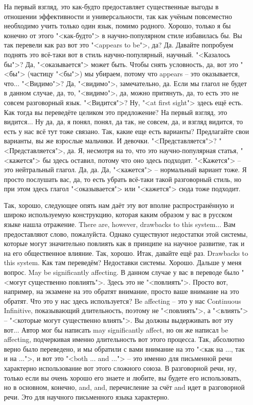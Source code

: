\documentclass[main.tex]{subfiles}
\begin{document}
На первый взгляд, это как-будто предоставляет существенные выгоды в отношении эффективности и универсальности, так как учёным повсеместно необходимо учить только один язык, помимо родного.
Хорошо, только я бы конечно от этого "<как-будто"> в научно-популярном стиле избавилась бы.
Вы так перевели как раз вот это "<appears to be">, да?
Да.
Давайте попробуем поднять это всё-таки вот в стиль научно-популярный, научный.
"<Казалось бы">?
Да, "<оказывается"> может быть.
Чтобы снять условность, да, вот это "<бы"> (частицу "<бы">) мы убираем, потому что appears -- это оказывается, что...
"<Видимо">?
Да, "<видимо">, замечательно, да.
Если мы глагол не будет в данном случае, да, то, "<видимо">, да, можно притянуть, да, то есть это не совсем разговорный язык.
"<Видится">?
Ну, "<at first sight"> здесь ещё есть.
Как тогда вы переведёте целиком это предложение?
На первый взгляд, это видится...
Ну да, да, я понял, понял, да так, не совсем, да, и взгляд видится, то есть у нас всё тут тоже связано.
Так, какие еще есть варианты?
Предлагайте свои варианты, вы же взрослые мальчики.
И девочки.
"<Представляется">?
"<Представляется">, да.
Я, несмотря на то, что это научно-популярная статья, "<кажется"> бы здесь оставил, потому что оно здесь подходит.
"<Кажется"> -- это нейтральный глагол.
Да, да.
Да, "<кажется"> -- нормальный вариант тоже.
Я просто послушать вас, да, то есть убрать всё-таки такой разговорный стиль, но при этом здесь глагол "<оказывается"> или "<кажется"> сюда тоже подходит.

Так, хорошо, следующее опять нам даёт эту вот вполне распространённую и широко используемую конструкцию, которая каким образом у вас в русском языке нашла отражение.
There are, however, drawbacks to this system...
Вам предоставляют слово, пожалуйста.
Однако существуют недостатки этой системы, которые могут значительно повлиять как в принципе на научное развитие, так и на его общественное влияние.
Так, хорошо.
Итак, давайте ещё раз.
Drawbacks to this system.
Как там переведём?
Недоставки системы.
Хорошо.
Дальше у меня вопрос.
May be significantly affecting.
В данном случае у вас в переводе было "<могут существенно повлиять">.
Здесь это не "<повлиять">.
Просто вот, например, на экзамене на это обратят внимание, просто ваше внимание на это обратят.
Что это у нас здесь используется?
Be affecting -- это у нас Continuous Infinitive, показывающий длительность, поэтому не "<повлиять">, а "<влиять"> -- "<которые могут существенно влиять">.
Вы должны выдерживать вот эту вот...
Автор мог бы написать may significantly affect, но он же написал be affecting, подчеркивая именно длительность вот этого процесса.
Так, абсолютно верно было переведено, и мы обратили с вами внимание на это "<как на ..., так и на ...">, и вот это "<both ... and ..."> -- это именно для письменной речи характерно использование вот этого сложного союза.
В разговорной речи, ну, только если вы очень хорошо его знаете и любите, вы будете его использовать, но в основном, конечно, and, and, перечисление за счёт and идет в разговорной речи.
Это для научного письменного языка характерно.
\end{document}
